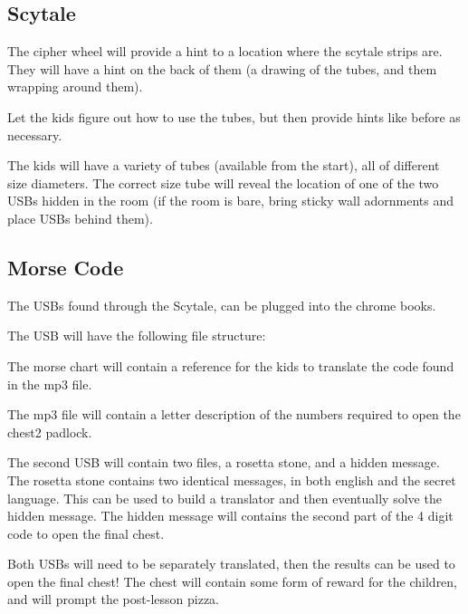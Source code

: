 \documentclass{lessonplan}
\begin{document}
    \subsection{Scytale}

      The cipher wheel will provide a hint to a location where the scytale strips are.
      They will have a hint on the back of them (a drawing of the tubes, and them wrapping around them).

      Let the kids figure out how to use the tubes, but then provide hints like before as necessary.

      The kids will have a variety of tubes (available from the start), all of different size diameters.
      The correct size tube will reveal the location of one of the two USBs hidden in the room
      (if the room is bare, bring sticky wall adornments and place USBs behind them).

    \subsection{Morse Code}

      The USBs found through the Scytale, can be plugged into the chrome books.

      The USB will have the following file structure: 


      The morse chart will contain a reference for the kids to translate the code found in the mp3 file.


      The mp3 file will contain a letter description of the numbers required to open the chest2 padlock.


      The second USB will contain two files, a rosetta stone, and a hidden message. 
      The rosetta stone contains two identical messages, in both english and the secret language. 
      This can be used to build a translator and then eventually solve the hidden message.
      The hidden message will contains the second part of the 4 digit code to open the final chest.


      Both USBs will need to be separately translated, then the results can be used to open the final chest!
      The chest will contain some form of reward for the children, and will prompt the post-lesson pizza.
      
\end{document}
